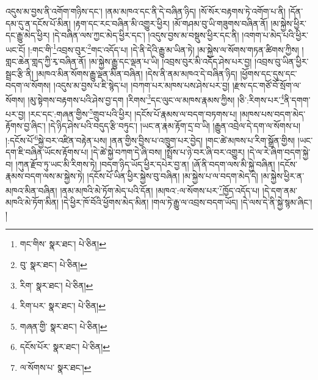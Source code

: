 འདུས་མ་བྱས་ནི་འགོག་གཉིས་དང་། །ནམ་མཁའ་དང་ནི་དེ་བཞིན་ཉིད། །སོ་སོར་བརྟགས་ཏེ་འགོག་པ་ནི། །དོན་དམ་དུ་ན་དངོས་པོ་མིན། །རྟག་དང་རང་བཞིན་མི་འགྱུར་ཕྱིར། །མོ་གཤམ་བུ་ཡི་གཟུགས་བཞིན་ནོ། །མ་སྐྱེས་ཕྱིར་དང་རྒྱུ་མེད་ཕྱིར། །དེ་བཞིན་ལས་ཀྱང་མེད་ཕྱིར་དང་། །འདུས་བྱས་མ་བསྡུས་ཕྱིར་དང་ནི། །འགག་པ་མེད་པའི་ཕྱིར་ཡང་ངོ། །:གང་གི་\footnote{གང་གིས་  སྣར་ཐང་།  པེ་ཅིན། }འབྲས་བུར་\footnote{བུ་  སྣར་ཐང་།  པེ་ཅིན། }གང་འདོད་པ། །དེ་ནི་དེའི་རྒྱུ་མ་ཡིན་ཏེ། །མ་སྐྱེས་ལ་སོགས་གཏན་ཚིགས་ཀྱིས། །གླང་ཆེན་གླད་ཀྱི་རྭ་བཞིན་ནོ། །མ་སྐྱེས་རྒྱུ་དང་ལྡན་པ་ཡི། །འབྲས་བུར་མི་འདོད་ཤེས་པར་བྱ། །འབྲས་བུ་ཡིན་ཕྱིར་སྦྲང་རྩི་ནི། །མཁའ་མིན་སོགས་རྒྱུ་ལྡན་མིན་བཞིན། །དེས་ནི་ནམ་མཁའ་དེ་བཞིན་ཉིད། །ཕྱོགས་དང་དུས་དང་བདག་ལ་སོགས། །འདུས་མ་བྱས་པ་ཇི་སྙེད་པ། །བཀག་པར་མཁས་པས་ཤེས་པར་བྱ། །རྫས་དང་གཙོ་བོ་སྲོག་ལ་སོགས། །མུ་སྟེགས་བརྟགས་པའི་ཤེས་བྱ་དག །རིགས་\footnote{རིག་  སྣར་ཐང་།  པེ་ཅིན། }དང་ལུང་ལ་མཁས་རྣམས་ཀྱིས། །ཅི་:རིགས་པར་\footnote{རིག་པར་  སྣར་ཐང་།  པེ་ཅིན། }ནི་དགག་པར་བྱ། །རང་དང་:གཞན་གྱིས་\footnote{གཞན་གྱི་  སྣར་ཐང་།  པེ་ཅིན། }གྲུབ་པའི་ཕྱིར། །དངོས་པོ་རྣམས་ལ་བདག་བཏགས་པ། །མཁས་པས་བདག་མེད་རྟོགས་བྱ་ཞིང་། །དེ་ཉིད་ཤེས་པའི་བདུད་རྩི་བཏུང་། །ཡང་ན་རྣམ་རྟོག་དྲ་བ་ཡི། །རྒྱུན་འབྲེལ་དེ་དག་ལ་སོགས་པ། །:དངོས་པོ་\footnote{དངོས་པོར་  སྣར་ཐང་།  པེ་ཅིན། }སྐྱེ་བར་འཛིན་བརྟེན་པས། །ནན་གྱིས་བྱིས་པ་འཁྲུག་པར་བྱེད། །གང་ཚེ་མཁས་པ་རིག་སྒྲོན་གྱིས། །ཡང་དག་ཇི་བཞིན་ཡོངས་རྟོགས་པ། །དེ་ཚེ་སྐྱེ་བཀག་དེ་ཞི་བས། །སྤྲོས་པ་ཉེ་བར་ཞི་བར་འགྱུར། །དེ་ལ་རེ་ཞིག་བདག་སྐྱེ་བ། །ཀུན་རྫོབ་ཏུ་ཡང་མི་རིགས་ཏེ། །བདག་ཉིད་ཡོད་ཕྱིར་དཔེར་བྱ་ན། །ཞོ་ནི་བདག་ལས་མི་སྐྱེ་བཞིན། །དངོས་རྣམས་བདག་ལས་མ་སྐྱེས་ཏེ། །དངོས་པོ་ཡིན་ཕྱིར་སྐྱེས་བུ་བཞིན། །མ་སྐྱེས་པ་ལ་བདག་མེད་དེ། །མ་སྐྱེས་ཕྱིར་ན་མཁའ་མིན་བཞིན། །ནམ་མཁའི་མེ་ཏོག་མེད་པའི་དོན། །མཁའ་:ལ་སོགས་པར་\footnote{ལ་སོགས་པ་  སྣར་ཐང་། }ཁྱོད་འདོད་པ། །དེ་དག་ནམ་མཁའི་མེ་ཏོག་མིན། །དེ་ཕྱིར་ཁོ་བོའི་ཕྱོགས་མེད་མིན། །གལ་ཏེ་རྒྱུ་ལ་འབྲས་བདག་ཡོད། །དེ་ལས་དེ་ནི་སྐྱེ་སྙམ་ཞིང་། །
